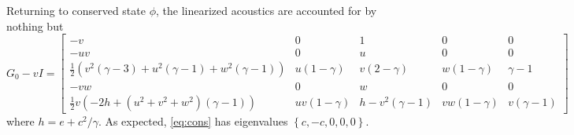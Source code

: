\documentclass[letterpaper,11pt,nointlimits,reqno]{amsart}
\begin{document}
Returning to conserved state $\phi$, the linearized acoustics are accounted for
by nothing but
\begin{equation}\label{eq:cons}
  G_0 - vI =
\begin{bmatrix}
 -v & 0 & 1 & 0 & 0 \\
 -u v & 0 & u & 0 & 0 \\
 \frac{1}{2} \left(v^2 (\gamma-3)+u^2 (\gamma-1)+w^2 (\gamma-1 )\right) & u(1-\gamma) & v (2-\gamma ) & w(1-\gamma) & \gamma-1  \\
 -v w & 0 & w & 0 & 0 \\
 \frac{1}{2} v \left(-2 h+\left(u^2+v^2+w^2\right) (\gamma-1 )\right) & u v (1-\gamma ) & h-v^2 (\gamma-1 ) & v w (1-\gamma ) & v (\gamma-1)
\end{bmatrix}
\end{equation}
where $h=e + c^2 / \gamma$.
As expected, \eqref{eq:cons} has eigenvalues $\left\{c, -c, 0, 0, 0\right\}$.
\end{document}
